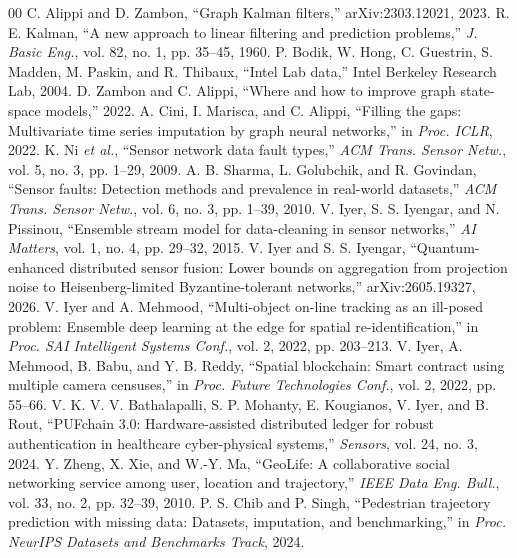 \documentclass[conference]{IEEEtran}
\begin{document}
\begin{thebibliography}{00}
 C. Alippi and D. Zambon, ``Graph Kalman filters,''
arXiv:2303.12021, 2023.
 R. E. Kalman, ``A new approach to linear filtering and
prediction problems,'' \emph{J. Basic Eng.}, vol. 82, no. 1, pp. 35--45, 1960.
 P. Bodik, W. Hong, C. Guestrin, S. Madden, M. Paskin, and
R. Thibaux, ``Intel Lab data,'' Intel Berkeley Research Lab, 2004.
 D. Zambon and C. Alippi, ``Where and how to improve graph
state-space models,'' 2022.
 A. Cini, I. Marisca, and C. Alippi, ``Filling the gaps:
Multivariate time series imputation by graph neural networks,'' in
\emph{Proc. ICLR}, 2022.
 K. Ni \emph{et al.}, ``Sensor network data fault types,''
\emph{ACM Trans. Sensor Netw.}, vol. 5, no. 3, pp. 1--29, 2009.
 A. B. Sharma, L. Golubchik, and R. Govindan, ``Sensor
faults: Detection methods and prevalence in real-world datasets,''
\emph{ACM Trans. Sensor Netw.}, vol. 6, no. 3, pp. 1--39, 2010.
 V. Iyer, S. S. Iyengar, and N. Pissinou, ``Ensemble stream
model for data-cleaning in sensor networks,'' \emph{AI Matters}, vol. 1,
no. 4, pp. 29--32, 2015.
 V. Iyer and S. S. Iyengar, ``Quantum-enhanced distributed
sensor fusion: Lower bounds on aggregation from projection noise to
Heisenberg-limited Byzantine-tolerant networks,'' arXiv:2605.19327, 2026.
 V. Iyer and A. Mehmood, ``Multi-object on-line tracking as
an ill-posed problem: Ensemble deep learning at the edge for spatial
re-identification,'' in \emph{Proc. SAI Intelligent Systems Conf.}, vol. 2,
2022, pp. 203--213.
 V. Iyer, A. Mehmood, B. Babu, and Y. B. Reddy, ``Spatial
blockchain: Smart contract using multiple camera censuses,'' in
\emph{Proc. Future Technologies Conf.}, vol. 2, 2022, pp. 55--66.
 V. K. V. V. Bathalapalli, S. P. Mohanty,
E. Kougianos, V. Iyer, and B. Rout, ``PUFchain 3.0: Hardware-assisted
distributed ledger for robust authentication in healthcare cyber-physical
systems,'' \emph{Sensors}, vol. 24, no. 3, 2024.
 Y. Zheng, X. Xie, and W.-Y. Ma, ``GeoLife: A
collaborative social networking service among user, location and
trajectory,'' \emph{IEEE Data Eng. Bull.}, vol. 33, no. 2, pp. 32--39, 2010.
 P. S. Chib and P. Singh, ``Pedestrian
trajectory prediction with missing data: Datasets, imputation, and
benchmarking,'' in \emph{Proc. NeurIPS Datasets and Benchmarks Track}, 2024.
\end{thebibliography}
\end{document}
